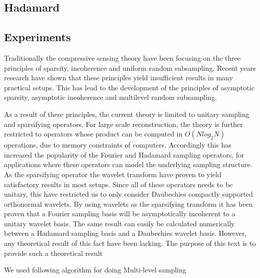 \documentclass{article}
\begin{document}
\subsection{Hadamard}




\subsection{Experiments}

Traditionally the compressive sensing theory have been focusing on the three principles of sparsity, incoherence and uniform random subsampling. Recent years research have shown that these principles yield insufficient results in many
practical setups. This has lead to the development of the principles of asymptotic sparsity, asymptotic incoherence and multilevel random subsampling.

As a result of these principles, the current theory is limited to unitary sampling and sparsifying operators. For large scale reconstruction, the theory is further restricted to operators whose product can be computed in $O(N log_2 N)$ operations, due to memory constraints of computers. Accordingly this has increased the popularity of the Fourier and Hadamard sampling operators, for applications where these operators can model the underlying sampling structure. As the sparsifying operator the wavelet transform have proven to yield satisfactory results in most setups. Since all of these operators needs to be unitary, this have restricted us to only consider Daubechies compactly supported orthonormal wavelets. By using wavelets as the sparsifying transform it has been proven that a Fourier sampling basis will be asymptotically incoherent to a unitary wavelet basis. The same result can easily be calculated numerically between a Hadamard sampling basis and a Daubechies wavelet basis. However, any theoretical result
of this fact have been lacking. The purpose of this text is to provide such a
theoretical result


We used following algorithm for doing Multi-level sampling
\end{document}
